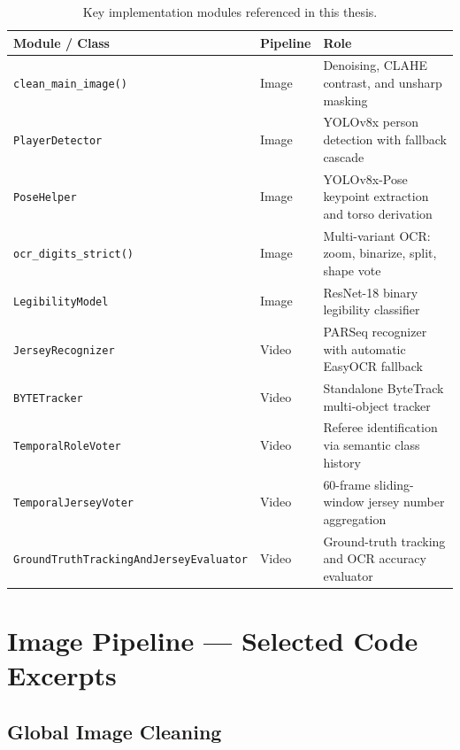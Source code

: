 \begin{table}[H]
    \centering
    \caption{Key implementation modules referenced in this thesis.}
    \label{tab:code-modules}
    \small
    \begin{tabular}{@{}p{4.5cm}p{3cm}p{5.5cm}@{}}
        \toprule
        \textbf{Module / Class} & \textbf{Pipeline} & \textbf{Role} \\
        \midrule
        \texttt{clean\_main\_image()} & Image & Denoising, CLAHE contrast, and unsharp masking \\
        \texttt{PlayerDetector} & Image & YOLOv8x person detection with fallback cascade \\
        \texttt{PoseHelper} & Image & YOLOv8x-Pose keypoint extraction and torso derivation \\
        \texttt{ocr\_digits\_strict()} & Image & Multi-variant OCR: zoom, binarize, split, shape vote \\
        \texttt{LegibilityModel} & Image & ResNet-18 binary legibility classifier \\
        \texttt{JerseyRecognizer} & Video & PARSeq recognizer with automatic EasyOCR fallback \\
        \texttt{BYTETracker} & Video & Standalone ByteTrack multi-object tracker \\
        \texttt{TemporalRoleVoter} & Video & Referee identification via semantic class history \\
        \texttt{TemporalJerseyVoter} & Video & 60-frame sliding-window jersey number aggregation \\
        \texttt{GroundTruthTrackingAndJerseyEvaluator} & Video & Ground-truth tracking and OCR accuracy evaluator \\
        \bottomrule
    \end{tabular}
\end{table}

\section{Image Pipeline --- Selected Code Excerpts}
\label{sec:appx-image-code}

\subsection{Global Image Cleaning}

